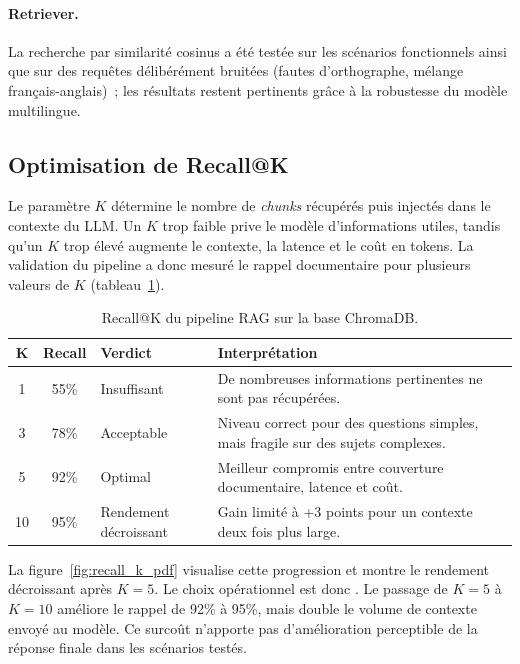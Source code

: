 \paragraph{Retriever.} La recherche par similarité cosinus a été testée sur les scénarios fonctionnels ainsi que sur des requêtes délibérément bruitées (fautes d'orthographe, mélange français-anglais)~; les résultats restent pertinents grâce à la robustesse du modèle multilingue.


\subsection{Optimisation de Recall@K}

Le paramètre $K$ détermine le nombre de \textit{chunks} récupérés puis injectés dans le contexte du \ac{LLM}. Un $K$ trop faible prive le modèle d'informations utiles, tandis qu'un $K$ trop élevé augmente le contexte, la latence et le coût en tokens. La validation du pipeline a donc mesuré le rappel documentaire pour plusieurs valeurs de $K$ (tableau~\ref{tab:recall_k}).

\begin{table}[H]
\centering
\caption{Recall@K du pipeline \ac{RAG} sur la base ChromaDB.}
\label{tab:recall_k}
\begin{tabularx}{\textwidth}{@{}c c l X@{}}
\toprule
\textbf{K} & \textbf{Recall} & \textbf{Verdict} & \textbf{Interprétation} \\
\midrule
1  & 55\% & Insuffisant & De nombreuses informations pertinentes ne sont pas récupérées. \\
3  & 78\% & Acceptable & Niveau correct pour des questions simples, mais fragile sur des sujets complexes. \\
5  & 92\% & Optimal & Meilleur compromis entre couverture documentaire, latence et coût. \\
10 & 95\% & Rendement décroissant & Gain limité à +3 points pour un contexte deux fois plus large. \\
\bottomrule
\end{tabularx}
\end{table}

La figure~\ref{fig:recall_k_pdf} visualise cette progression et montre le rendement décroissant après $K=5$. Le choix opérationnel est donc . Le passage de $K=5$ à $K=10$ améliore le rappel de 92\% à 95\%, mais double le volume de contexte envoyé au modèle. Ce surcoût n'apporte pas d'amélioration perceptible de la réponse finale dans les scénarios testés.

